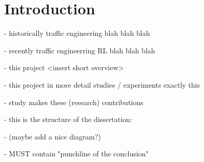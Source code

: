 \chapter{Introduction}

\setcounter{page}{1}

- historically traffic engineering blah blah blah

- recently traffic engineerring RL blah blah blah

- this project <insert short overview>

- this project in more detail studies / experiments exactly this

- study makes these (research) contributions

- this is the structure of the dissertation:

- (maybe add a nice diagram?)

- MUST contain "punchline of the conclusion"